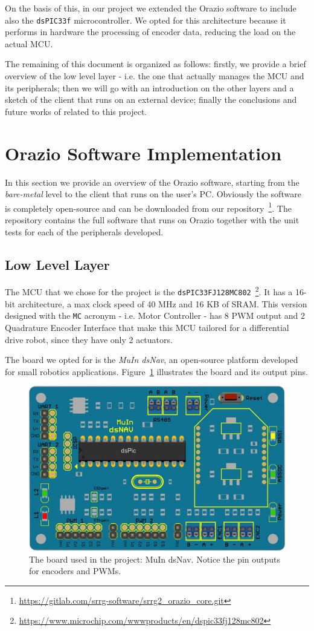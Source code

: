 \documentclass[10pt,a4paper, notitlepage]{report}
\begin{document}
On the basis of this, in our project we extended the Orazio software to include also the \texttt{dsPIC33f} microcontroller. We opted for this architecture because it performs in hardware the processing of encoder data, reducing the load on the actual MCU.

The remaining of this document is organized as follows: firstly, we provide a brief overview of the low level layer - i.e. the one that actually manages the MCU and its peripherals; then we will go with an introduction on the other layers and a sketch of the client that runs on an external device; finally the conclusions and future works of related to this project.

\section*{Orazio Software Implementation} \label{sec:approach}
In this section we provide an overview of the Orazio software, starting from the \textit{bare-metal} level to the client that runs on the user's PC. Obviously the software is completely open-source and can be downloaded from our repository~\footnote{\href{https://gitlab.com/srrg-software/srrg2_orazio_core.git}{https://gitlab.com/srrg-software/srrg2\_orazio\_core.git}}. The repository contains the full software that runs on Orazio together with the unit tests for each of the peripherals developed.
\subsection*{Low Level Layer}
The MCU that we chose for the project is the \texttt{dsPIC33FJ128MC802}~\footnote{\href{https://www.microchip.com/wwwproducts/en/dspic33fj128mc802}{https://www.microchip.com/wwwproducts/en/dspic33fj128mc802}}. It has a 16-bit architecture, a max clock speed of 40 MHz and 16 KB of SRAM. This version designed with the \texttt{MC} acronym - i.e. Motor Controller - has 8 PWM output and 2 Quadrature Encoder Interface that make this MCU tailored for a differential drive robot, since they have only 2 actuators.

The board we opted for is the \textit{MuIn dsNav}, an open-source platform developed for small robotics applications. Figure~\ref{fig:dsnav} illustrates the board and its output pins.

\begin{figure}[!h]
  \centering
  \includegraphics[width=0.6\linewidth]{pics/dsnav_simple}
  \caption{The board used in the project: MuIn dsNav. Notice the pin outputs for encoders and PWMs.}
  \label{fig:dsnav}
\end{figure}
\end{document}
